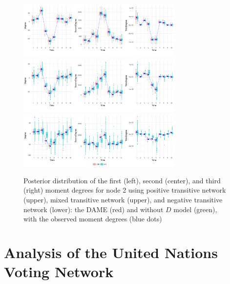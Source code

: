 \documentclass[a4paper]{article}
\begin{document}
\begin{figure}[H]
	\centering
			\includegraphics[width=0.73\textwidth]{plots_paper/bothpositive2-1.png}	
						\includegraphics[width=0.73\textwidth]{plots_paper/mixed2-1.png}	
						\includegraphics[width=0.73\textwidth]{plots_paper/bothnegative2-1.png}	
	\caption {Posterior distribution of the first (left), second (center), and third (right) moment degrees for node 2 using positive transitive network (upper), mixed transitive network (upper), and negative transitive network (lower): the DAME (red) and without $D$ model (green), with the observed moment degrees (blue dots)}
	\label{figure:negativitystudy}
\end{figure}
\section{Analysis of the United Nations Voting Network}\label{sec: UNvoting}
\end{document}
